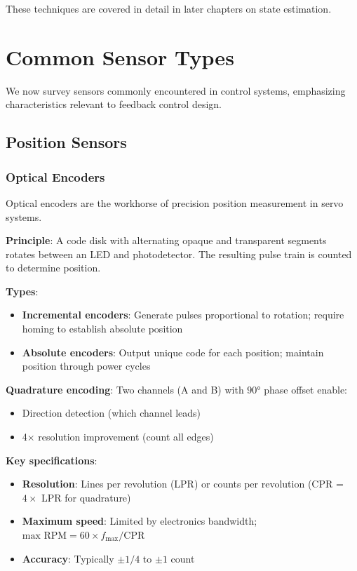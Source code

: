 These techniques are covered in detail in later chapters on state estimation.

\section{Common Sensor Types}
\label{sec:sensor_types}

We now survey sensors commonly encountered in control systems, emphasizing characteristics relevant to feedback control design.

\subsection{Position Sensors}

\subsubsection{Optical Encoders}

Optical encoders are the workhorse of precision position measurement in servo systems.

\textbf{Principle}: A code disk with alternating opaque and transparent segments rotates between an LED and photodetector. The resulting pulse train is counted to determine position.

\textbf{Types}:
\begin{itemize}
    \item \textbf{Incremental encoders}: Generate pulses proportional to rotation; require homing to establish absolute position
    \item \textbf{Absolute encoders}: Output unique code for each position; maintain position through power cycles
\end{itemize}

\textbf{Quadrature encoding}: Two channels (A and B) with $90°$ phase offset enable:
\begin{itemize}
    \item Direction detection (which channel leads)
    \item 4$\times$ resolution improvement (count all edges)
\end{itemize}

\textbf{Key specifications}:
\begin{itemize}
    \item \textbf{Resolution}: Lines per revolution (LPR) or counts per revolution (CPR = $4 \times$ LPR for quadrature)
    \item \textbf{Maximum speed}: Limited by electronics bandwidth; $\text{max RPM} = 60 \times f_{\text{max}} / \text{CPR}$
    \item \textbf{Accuracy}: Typically $\pm 1/4$ to $\pm 1$ count
\end{itemize}


